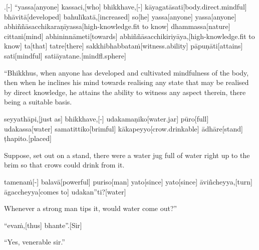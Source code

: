 \begin{samepage}
.[-] “yassa[anyone] kassaci,[who] bhikkhave,[-] kāyagatāsati[body.direct.mindful] bhāvitā[developed] bahulīkatā,[increased] so[he] yassa[anyone] yassa[anyone] abhiññāsacchikaraṇīyassa[high-knowledge.fit to know] dhammassa[nature] cittaṁ[mind] abhininnāmeti[towards] abhiññāsacchikiriyāya,[high-knowledge.fit to know] ta[that] tatre[there] sakkhibhabbataṁ[witness.ability] pāpuṇāti[attains] sati[mindful] satiāyatane.[mindfl.sphere]
\endgl
\nopagebreak
\linespread{0.5}
\begin{spacin}{0.2}
{\PaliGlossFT “Bhikkhus, when anyone has developed and cultivated mindfulness of the body, then when he inclines his mind towards realising any state that may be realised by direct knowledge, he attains the ability to witness any aspect therein, there being a suitable basis.}
\end{spacin}
\vskip 12pt
\end{samepage}
\begin{samepage}
\begingl[glneveryline={\PaliGlossA,\PaliGlossB}]
seyyathāpi,[just as] bhikkhave,[-] udakamaṇiko[water.jar] pūro[full] udakassa[water] samatittiko[brimful] kākapeyyo[crow.drinkable] ādhāre[stand] ṭhapito.[placed]
\endgl
\nopagebreak
\linespread{0.5}
\begin{spacin}{0.2}
{\PaliGlossFT Suppose, set out on a stand, there were a water jug full of water right up to the brim so that crows could drink from it.}
\end{spacin}
\vskip 12pt
\end{samepage}
\begin{samepage}
\begingl[glneveryline={\PaliGlossA,\PaliGlossB}]
tamenaṁ[-] balavā[powerful] puriso[man] yato[since] yato[since] āviñcheyya,[turn] āgaccheyya[comes to] udakan”ti?[water]
\endgl
\nopagebreak
\linespread{0.5}
\begin{spacin}{0.2}
{\PaliGlossFT Whenever a strong man tips it, would water come out?”}
\end{spacin}
\vskip 12pt
\end{samepage}
\begin{samepage}
\begingl[glneveryline={\PaliGlossA,\PaliGlossB}]
“evaṁ,[thus] bhante”.[Sir]
\endgl
\nopagebreak
\linespread{0.5}
\begin{spacin}{0.2}
{\PaliGlossFT “Yes, venerable sir.”}
\end{spacin}
\vskip 12pt
\end{samepage}
